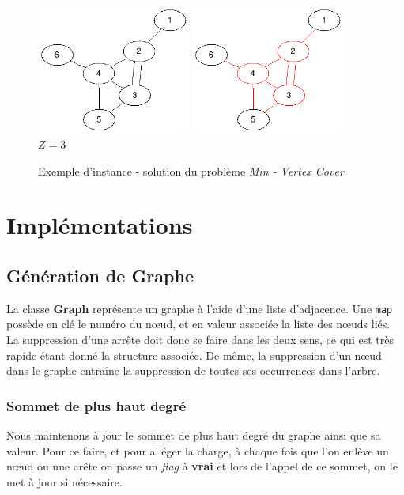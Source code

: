 \documentclass[a4paper,10pt,twoside]{report}
\begin{document}
    \begin{figure}[h]
    \centering
    \includegraphics[width=0.45\textwidth]{grapheinitial}
    \includegraphics[width=0.45\textwidth]{graphefinal}\\
    \Huge{$Z=3$}
    \caption{Exemple d'instance - solution du problème \textit{Min - Vertex Cover}}
    \label{figure_exemple}
    \end{figure}

\chapter{Implémentations}
    \section{Génération de Graphe}
      La classe \textbf{Graph} représente un graphe à l'aide d'une liste d'adjacence. Une \texttt{map} possède en clé le numéro du n\oe{}ud, et en valeur associée la liste des n\oe{}uds liés.
      La suppression d'une arrête doit donc se faire dans les deux sens, ce qui est très rapide étant donné la structure associée. De même, la suppression d'un n\oe{}ud dans le graphe entraîne la suppression de toutes ses occurrences dans l'arbre.
      
        \subsection{Sommet de plus haut degré}
        Nous maintenons à jour le sommet de plus haut degré du graphe ainsi que sa valeur. Pour ce faire, et pour alléger la charge, à chaque fois que l'on enlève un n\oe{}ud ou une arête on passe un \textit{flag} à \textbf{vrai} et lors de l'appel de ce sommet, on le met à jour si nécessaire.
        
\end{document}
